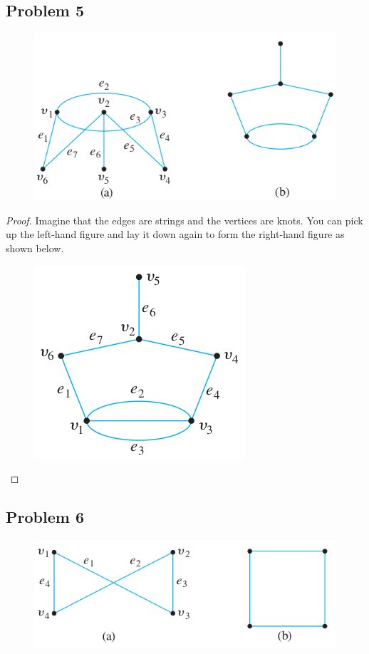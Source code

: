 \documentclass[14pt]{extarticle}
\begin{document}
\subsection{Problem 5}

\begin{figure}[ht!]
\centering
\includegraphics[scale=0.5]{../images/1.4.5.png}
\end{figure}

\begin{proof}
Imagine that the edges are strings and the vertices are knots. You can pick up
the left-hand figure and lay it down again to form the right-hand figure as
shown below.

\begin{figure}[ht!]
\centering
\includegraphics[scale=0.4]{../images/1.4.5.sol.png}
\end{figure}
\end{proof}

\subsection{Problem 6}
\begin{figure}[ht!]
\centering
\includegraphics[scale=0.4]{../images/1.4.6.png}
\end{figure}
\end{document}
